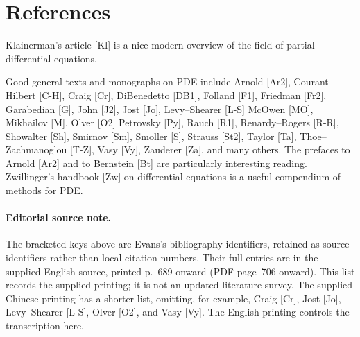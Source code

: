 \section{References}
\label{sec:1-6}

Klainerman's article [Kl] is a nice modern overview of the field of partial differential equations.

Good general texts and monographs on PDE include Arnold [Ar2], Courant--Hilbert [C-H], Craig [Cr], DiBenedetto [DB1], Folland [F1], Friedman [Fr2], Garabedian [G], John [J2], Jost [Jo], Levy--Shearer [L-S] McOwen [MO], Mikhailov [M], Olver [O2] Petrovsky [Py], Rauch [R1], Renardy--Rogers [R-R], Showalter [Sh], Smirnov [Sm], Smoller [S], Strauss [St2], Taylor [Ta], Thoe--Zachmanoglou [T-Z], Vasy [Vy], Zauderer [Za], and many others. The prefaces to Arnold [Ar2] and to Bernstein [Bt] are particularly interesting reading. Zwillinger's handbook [Zw] on differential equations is a useful compendium of methods for PDE.

\paragraph{Editorial source note.}
The bracketed keys above are Evans's bibliography identifiers, retained as
source identifiers rather than local citation numbers. Their full entries
are in the supplied English source, printed p.~689 onward (PDF page~706 onward).
This list records the supplied printing; it is not an updated literature survey.
The supplied Chinese printing has a shorter list, omitting, for example,
Craig [Cr], Jost [Jo], Levy--Shearer [L-S], Olver [O2], and Vasy [Vy].
The English printing controls the transcription here.
